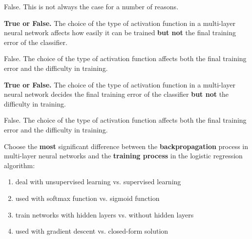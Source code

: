 \documentclass{article}
\begin{document}
\begin{probset}
\begin{prob}
\begin{subprobset}
\begin{subprob}
            \begin{soln}
                False. This is not always the case for a number of reasons.
            \end{soln}
        \end{subprob}

        \begin{subprob}
            \textbf{True or False.} The choice of the type of activation function in a multi-layer neural network affects how easily it can be trained \textbf{but not} the final training error of the classifier.

            \begin{soln}
                False. The choice of the type of activation function affects both the final training error and the difficulty in training.
            \end{soln}
        \end{subprob}

        \begin{subprob}
            \textbf{True or False.} The choice of the type of activation function in a multi-layer neural network decides the final training error of the classifier \textbf{but not} the difficulty in training.

            \begin{soln}
                False. The choice of the type of activation function affects both the final training error and the difficulty in training.
            \end{soln}
        \end{subprob}

        \newpage

        \begin{subprob}
            Choose the \textbf{most} significant difference between the \textbf{backpropagation} process in multi-layer neural networks and the \textbf{training process} in the logistic regression algorithm:

            \begin{enumerate}[label=\Alph*.]
                \item deal with unsupervised learning vs. supervised learning
                \item used with softmax function vs. sigmoid function
                \item train networks with hidden layers vs. without hidden layers
                \item used with gradient descent vs. closed-form solution
            \end{enumerate}


\end{subprob}
\end{subprobset}
\end{prob}
\end{probset}
\end{document}
